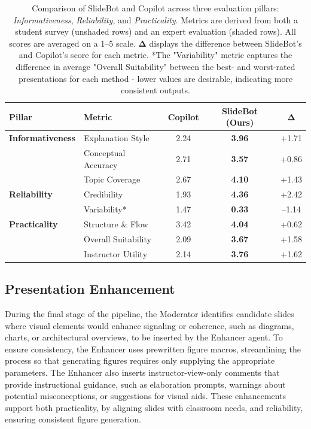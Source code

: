 \documentclass[letterpaper]{article} %
\begin{document}
\begin{table}[h]
\centering
\begin{tabular}{llcc|c}
\toprule
\textbf{Pillar} & \textbf{Metric} & \textbf{Copilot} & \textbf{SlideBot (Ours)} & $\boldsymbol{\Delta}$ \\
\midrule
\textbf{Informativeness}
  & Explanation Style     & 2.24 & \textbf{3.96} & +1.71 \\
\rowcolor{gray!25}
  & Conceptual Accuracy   & 2.71 & \textbf{3.57} & +0.86 \\
\rowcolor{gray!25}
  & Topic Coverage             & 2.67 & \textbf{4.10} & +1.43 \\
\midrule
\textbf{Reliability} 
& Credibility & 1.93 & \textbf{4.36} & +2.42 \\
& Variability* & 1.47 & \textbf{0.33} & –1.14 \\

\midrule
\textbf{Practicality}
  & Structure \& Flow     & 3.42 & \textbf{4.04} & +0.62 \\
  & Overall Suitability   & 2.09 &\textbf{ 3.67} & +1.58 \\
\rowcolor{gray!25}
  & Instructor Utility    & 2.14 & \textbf{3.76} & +1.62 \\
\bottomrule
\end{tabular}
\caption{Comparison of SlideBot and Copilot across three evaluation pillars: \textit{Informativeness}, \textit{Reliability}, and \textit{Practicality}. Metrics are derived from both a student survey (unshaded rows) and an expert evaluation (shaded rows). All scores are averaged on a 1–5 scale. $\boldsymbol{\Delta}$ displays the difference between SlideBot's and Copilot's score for each metric. *The "Variability" metric captures the difference in average "Overall Suitability" between the best- and worst-rated presentations for each method - lower values are desirable, indicating more consistent outputs.}
\label{tab:main_eval}
\end{table}




\subsection{Presentation Enhancement}

During the final stage of the pipeline, the Moderator identifies candidate slides where visual elements would enhance signaling or coherence, such as diagrams, charts, or architectural overviews, to be inserted by the Enhancer agent. To ensure consistency, the Enhancer uses prewritten figure macros, streamlining the process so that generating figures requires only supplying the appropriate parameters. The Enhancer also inserts instructor-view-only comments that provide instructional guidance, such as elaboration prompts, warnings about potential misconceptions, or suggestions for visual aids. These enhancements support both practicality, by aligning slides with classroom needs, and reliability, ensuring consistent figure generation. 
\end{document}
